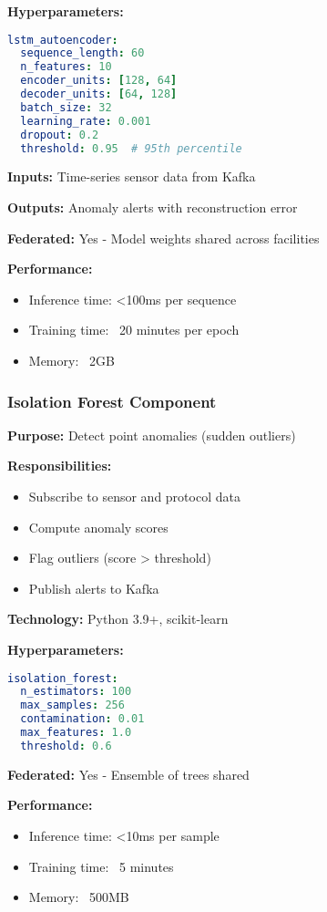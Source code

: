 \documentclass[12pt,a4paper]{article}
\begin{document}
\textbf{Hyperparameters:}
\begin{lstlisting}[language=yaml]
lstm_autoencoder:
  sequence_length: 60
  n_features: 10
  encoder_units: [128, 64]
  decoder_units: [64, 128]
  batch_size: 32
  learning_rate: 0.001
  dropout: 0.2
  threshold: 0.95  # 95th percentile
\end{lstlisting}

\textbf{Inputs:} Time-series sensor data from Kafka

\textbf{Outputs:} Anomaly alerts with reconstruction error

\textbf{Federated:} Yes - Model weights shared across facilities

\textbf{Performance:}
\begin{itemize}[leftmargin=1cm,itemsep=0pt]
    \item Inference time: <100ms per sequence
    \item Training time: ~20 minutes per epoch
    \item Memory: ~2GB
\end{itemize}

\subsubsection{Isolation Forest Component}

\textbf{Purpose:} Detect point anomalies (sudden outliers)

\textbf{Responsibilities:}
\begin{itemize}[leftmargin=1cm,itemsep=0pt]
    \item Subscribe to sensor and protocol data
    \item Compute anomaly scores
    \item Flag outliers (score > threshold)
    \item Publish alerts to Kafka
\end{itemize}

\textbf{Technology:} Python 3.9+, scikit-learn

\textbf{Hyperparameters:}
\begin{lstlisting}[language=yaml]
isolation_forest:
  n_estimators: 100
  max_samples: 256
  contamination: 0.01
  max_features: 1.0
  threshold: 0.6
\end{lstlisting}

\textbf{Federated:} Yes - Ensemble of trees shared

\textbf{Performance:}
\begin{itemize}[leftmargin=1cm,itemsep=0pt]
    \item Inference time: <10ms per sample
    \item Training time: ~5 minutes
    \item Memory: ~500MB
\end{itemize}
\end{document}
